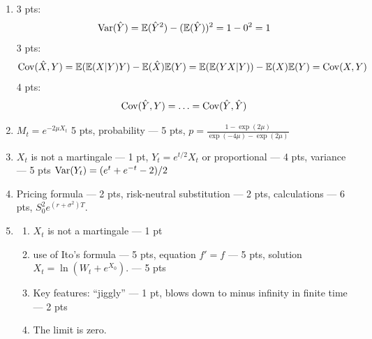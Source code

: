 \documentclass[pdftex,12pt,a4paper]{article}
\begin{document}
\begin{enumerate}
\item 3 pts:
\[
\operatorname{Var}(\hat{Y})=\mathbb{E}(\hat{Y}^2)-(\mathbb{E}(\hat{Y}))^2=1-0^2=1
\]
3 pts: 
\[
\operatorname{Cov}(\hat{X},Y)=\mathbb{E}(\mathbb{E}(X|Y)Y)-\mathbb{E}(\hat{X})\mathbb{E}(Y)=\mathbb{E}(\mathbb{E}(YX|Y))-\mathbb{E}(X)\mathbb{E}(Y)=\operatorname{Cov}(X,Y)
\]
4 pts:
\[
\operatorname{Cov}(\hat{Y},Y)=\ldots=\operatorname{Cov}(\hat{Y},\hat{Y})
\]

\item $M_t=e^{-2\mu X_t}$ 5 pts, probability --- 5 pts, $p=\frac{1-\exp(2\mu)}{\exp(-4\mu)-\exp(2\mu)}$

\item $X_t$ is not a martingale --- 1 pt, $Y_t=e^{t/2}X_t$ or proportional --- 4 pts, variance --- 5 pts $\operatorname{Var}(Y_t)=(e^t+e^{-t}-2)/2$

\item Pricing formula --- 2 pts, risk-neutral substitution --- 2 pts, calculations --- 6 pts, $S_0^2 e^{(r+\sigma^2)T}$.

\item
\begin{enumerate}
\item  $X_t$ is not a martingale --- 1 pt
\item use of Ito's formula --- 5 pts, equation $f'=f$ --- 5 pts, solution $X_t=\ln(W_t+e^{X_0})$. --- 5 pts
\item Key features: ``jiggly'' ---  1 pt, blows down to minus infinity in finite time --- 2 pts 
\item The limit is zero.
\end{enumerate}

\end{enumerate}
\end{document}
